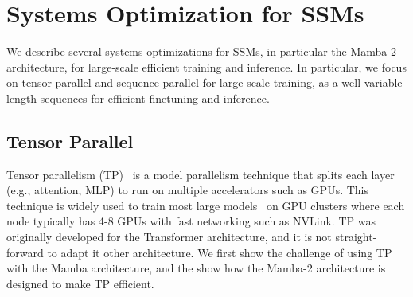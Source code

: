 \section{Systems Optimization for SSMs}
\label{sec:systems}

We describe several systems optimizations for SSMs, in particular the Mamba-2 architecture, for large-scale efficient training and inference.
In particular, we focus on tensor parallel and sequence parallel for large-scale training, as a well variable-length sequences for efficient finetuning and inference.

\subsection{Tensor Parallel}
\label{subsec:tp}

Tensor parallelism (TP)~\citep{shoeybi2019megatron} is a model parallelism technique that splits each layer (e.g., attention, MLP) to run on multiple accelerators such as GPUs.
This technique is widely used to train most large models~\citep{brown2020language, chowdhery2022palm, touvron2023llama, touvron2023llama2}  on GPU clusters where each node typically has 4-8 GPUs with fast networking such as NVLink.
TP was originally developed for the Transformer architecture, and it is not straight-forward to adapt it other architecture.
We first show the challenge of using TP with the Mamba architecture, and the show how the Mamba-2 architecture is designed to make TP efficient.

